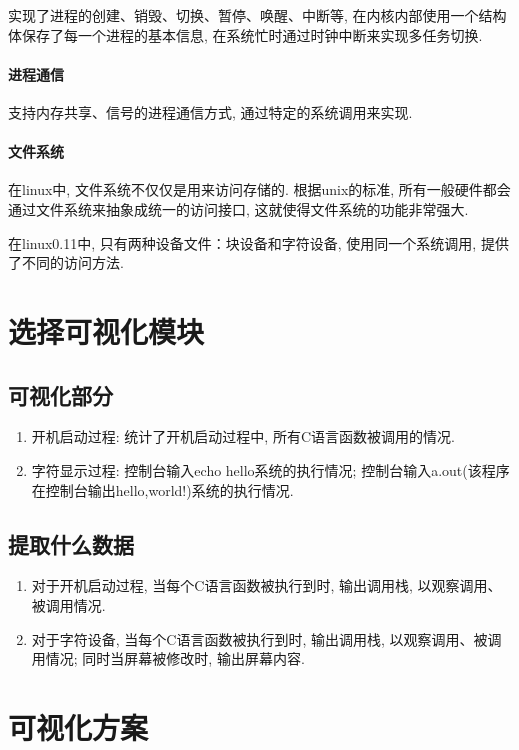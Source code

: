\documentclass{ctexart}
\begin{document}
实现了进程的创建、销毁、切换、暂停、唤醒、中断等, 在内核内部使用一个结构体保存了每一个进程的基本信息, 在系统忙时通过时钟中断来实现多任务切换. 

\paragraph{进程通信}

支持内存共享、信号的进程通信方式, 通过特定的系统调用来实现. 

\paragraph{文件系统}

在linux中, 文件系统不仅仅是用来访问存储的. 根据unix的标准, 所有一般硬件都会通过文件系统来抽象成统一的访问接口, 这就使得文件系统的功能非常强大. 

在linux0.11中, 只有两种设备文件：块设备和字符设备, 使用同一个系统调用, 提供了不同的访问方法. 

\section{选择可视化模块}
\subsection{可视化部分}
\begin{enumerate}
	\item 开机启动过程: 统计了开机启动过程中, 所有C语言函数被调用的情况. 
	\item 字符显示过程:
	\subitem 控制台输入echo hello系统的执行情况;
	\subitem 控制台输入a.out(该程序在控制台输出hello,world!)系统的执行情况.
\end{enumerate}
\subsection{提取什么数据}
\begin{enumerate}
	\item 对于开机启动过程, 当每个C语言函数被执行到时, 输出调用栈, 以观察调用、被调用情况.
	\item 对于字符设备, 当每个C语言函数被执行到时, 输出调用栈, 以观察调用、被调用情况; 同时当屏幕被修改时, 输出屏幕内容.
\end{enumerate}

\section{可视化方案}
\end{document}
